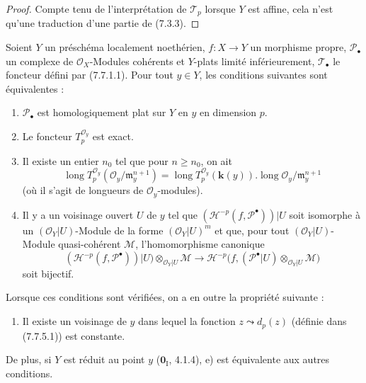 \begin{proof}
Compte tenu de l'interprétation de $\mathscr T_p$ lorsque $Y$ est affine, cela
n'est qu'une traduction d'une partie de (7.3.3).
\end{proof}

\begin{proposition}[7.8.4]
Soient $Y$ un préschéma localement noethérien, $f:X\to Y$ un morphisme propre,
$\mathscr P_\bullet$ un complexe de $\mathscr O_X$-Modules cohérents et $Y$-plats
limité inférieurement, $\mathscr T_\bullet$ le foncteur défini par \textup{(7.7.1.1)}.
Pour tout $y\in Y$, les conditions suivantes sont équivalentes :
\begin{enumerate}
  \item[\textup{a)}] $\mathscr P_\bullet$ est homologiquement plat sur $Y$ en $y$ en
    dimension $p$.
  \item[\textup{b)}] Le foncteur $T_p^{\mathscr O_y}$ est exact.
  \item[\textup{c)}] Il existe un entier $n_0$ tel que pour $n\geq n_0$, on ait
    \[
      \operatorname{long}T_p^{\mathscr O_y}
        (\mathscr O_y/\mathfrak m_y^{n+1})
      =
      \operatorname{long}T_p^{\mathscr O_y}(\boldsymbol{k}(y))
      .
      \operatorname{long}\mathscr O_y/\mathfrak m_y^{n+1}
      \tag{7.8.4.1}\label{III.7.8.4.1.fr}
    \]
    (où il s'agit de longueurs de $\mathscr O_y$-modules).
  \item[\textup{d)}] Il y a un voisinage ouvert $U$ de $y$ tel que
    $(\mathcal H^{-p}(f,\mathscr P^\bullet))|U$ soit isomorphe à un
    $(\mathscr O_Y|U)$-Module de la forme $(\mathscr O_Y|U)^m$ et que, pour tout
    $(\mathscr O_Y|U)$-Module quasi-cohérent $\mathscr M$, l'homomorphisme
    canonique
    \[
      (\mathcal H^{-p}(f,\mathscr P^\bullet))|U)
      \otimes_{\mathscr O_Y|U}\mathscr M
      \longrightarrow
      \mathcal H^{-p}
      \bigl(
        f,(\mathscr P^\bullet|U)
          \otimes_{\mathscr O_Y|U}\mathscr M
      \bigr)
      \tag{7.8.4.2}\label{III.7.8.4.2.fr}
    \]
    soit bijectif.
\end{enumerate}

Lorsque ces conditions sont vérifiées, on a en outre la propriété suivante :
\begin{enumerate}
  \item[\textup{e)}] Il existe un voisinage de $y$ dans lequel la fonction
    $z\leadsto d_p(z)$ \textup{(définie dans (7.7.5.1))} est constante.
\end{enumerate}

De plus, si $Y$ est \textup{réduit} au point $y$ \textup{($\mathbf{0}_{\mathrm I}$, 4.1.4)}, e) est
équivalente aux autres conditions.
\end{proposition}

